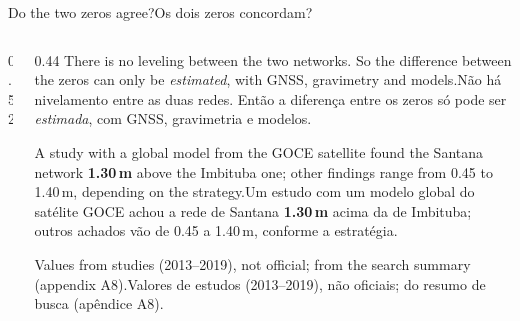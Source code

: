 \documentclass[aspectratio=169,11pt]{beamer}
\newcommand{\tr}[2]{\ifEN#2\else#1\fi}
\newcommand{\bnum}[1]{\ifmmode\textcolor{mTeal}{\mathbf{#1}}\else\textbf{\textcolor{mTeal}{#1}}\fi}
\begin{document}
\begin{frame}{\tr{Os dois zeros concordam?}{Do the two zeros agree?}}
  \begin{columns}[T]
    \begin{column}{0.52\textwidth}
      \centering
    \end{column}
    \begin{column}{0.44\textwidth}
      \small
      \tr{Não há nivelamento entre as duas redes. Então a diferença entre os zeros só pode ser
      \emph{estimada}, com GNSS, gravimetria e modelos.}{There is no leveling between the two
      networks. So the difference between the zeros can only be \emph{estimated}, with GNSS,
      gravimetry and models.}
      \medskip

      \tr{Um estudo com um modelo global do satélite GOCE achou a rede de Santana
      \bnum{\num{1.30}\,m} acima da de Imbituba; outros achados vão de \num{0.45} a
      \num{1.40}\,m, conforme a estratégia.}{A study with a global model from the GOCE satellite
      found the Santana network \bnum{\num{1.30}\,m} above the Imbituba one; other findings range
      from \num{0.45} to \num{1.40}\,m, depending on the strategy.}
      \medskip

      {\scriptsize\tr{Valores de estudos (2013--2019), não oficiais; do resumo de busca (apêndice
      A8).}{Values from studies (2013--2019), not official; from the search summary (appendix
      A8).}}
    \end{column}
  \end{columns}
\end{frame}
\end{document}
